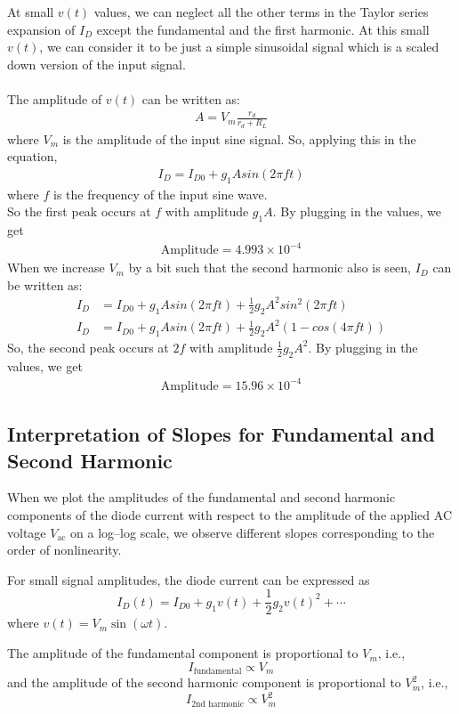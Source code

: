 \documentclass[12pt,a4paper]{article}
\begin{document}
At small $v(t)$ values, we can neglect all the other terms in the Taylor series expansion of $I_D$ except the fundamental and the first harmonic. At this small $v(t)$, we can consider it to be just a simple sinusoidal signal which is a scaled down version of the input signal.\\\\
The amplitude of $v(t)$ can be written as:
\begin{align*}
    A = V_m\frac{r_d}{r_d + R_L}
\end{align*}
where $V_m$ is the amplitude of the input sine signal. So, applying this in the equation,
\begin{align*}
    I_D = I_{D0} + g_1Asin(2 \pi f t)
\end{align*}
where $f$ is the frequency of the input sine wave.\\
So the first peak occurs at $f$ with amplitude $g_1A$. By plugging in the values, we get
\begin{align*}
    \text{Amplitude} = 4.993 \times 10^{-4}
\end{align*}
When we increase $V_m$ by a bit such that the second harmonic also is seen, $I_D$ can be written as:
\begin{align*}
     I_D &= I_{D0} + g_1Asin(2 \pi f t) + \frac{1}{2}g_2A^2sin^2(2\pi ft)\\
     I_D &= I_{D0} + g_1Asin(2 \pi f t) + \frac{1}{2}g_2A^2(1 - cos(4\pi ft))
\end{align*}
So, the second peak occurs at $2f$ with amplitude $\frac{1}{2}g_2A^2$. By plugging in the values, we get
\begin{align*}
    \text{Amplitude} = 15.96 \times 10^{-4}
\end{align*}
\pagebreak
\subsection*{Interpretation of Slopes for Fundamental and Second Harmonic}

When we plot the amplitudes of the fundamental and second harmonic components of the diode current 
with respect to the amplitude of the applied AC voltage $V_{\text{ac}}$ on a log–log scale, we observe 
different slopes corresponding to the order of nonlinearity.

For small signal amplitudes, the diode current can be expressed as
\[
I_D(t) = I_{D0} + g_1 v(t) + \frac{1}{2}g_2 v(t)^2 + \cdots
\]
where $v(t) = V_m \sin(\omega t)$.

The amplitude of the fundamental component is proportional to $V_m$, i.e.,
\[
I_{\text{fundamental}} \propto V_m
\]
and the amplitude of the second harmonic component is proportional to $V_m^2$, i.e.,
\[
I_{\text{2nd harmonic}} \propto V_m^2
\]
\end{document}
